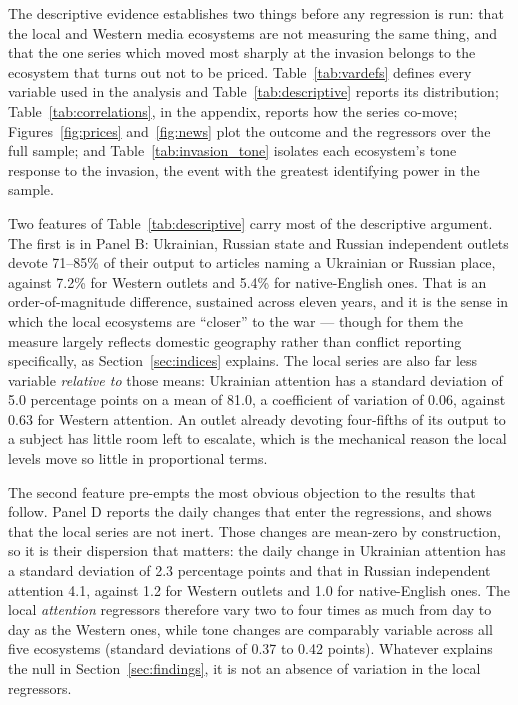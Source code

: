 \documentclass[12pt,a4paper]{article}
\begin{document}
The descriptive evidence establishes two things before any regression is run: that the local and Western media ecosystems are not measuring the same thing, and that the one series which moved most sharply at the invasion belongs to the ecosystem that turns out not to be priced. Table~\ref{tab:vardefs} defines every variable used in the analysis and Table~\ref{tab:descriptive} reports its distribution; Table~\ref{tab:correlations}, in the appendix, reports how the series co-move; Figures~\ref{fig:prices} and~\ref{fig:news} plot the outcome and the regressors over the full sample; and Table~\ref{tab:invasion_tone} isolates each ecosystem's tone response to the invasion, the event with the greatest identifying power in the sample.

Two features of Table~\ref{tab:descriptive} carry most of the descriptive argument. The first is in Panel B: Ukrainian, Russian state and Russian independent outlets devote 71--85\% of their output to articles naming a Ukrainian or Russian place, against 7.2\% for Western outlets and 5.4\% for native-English ones. That is an order-of-magnitude difference, sustained across eleven years, and it is the sense in which the local ecosystems are ``closer'' to the war --- though for them the measure largely reflects domestic geography rather than conflict reporting specifically, as Section~\ref{sec:indices} explains. The local series are also far less variable \textit{relative to} those means: Ukrainian attention has a standard deviation of 5.0 percentage points on a mean of 81.0, a coefficient of variation of 0.06, against 0.63 for Western attention. An outlet already devoting four-fifths of its output to a subject has little room left to escalate, which is the mechanical reason the local levels move so little in proportional terms.

The second feature pre-empts the most obvious objection to the results that follow. Panel D reports the daily changes that enter the regressions, and shows that the local series are not inert. Those changes are mean-zero by construction, so it is their dispersion that matters: the daily change in Ukrainian attention has a standard deviation of 2.3 percentage points and that in Russian independent attention 4.1, against 1.2 for Western outlets and 1.0 for native-English ones. The local \textit{attention} regressors therefore vary two to four times as much from day to day as the Western ones, while tone changes are comparably variable across all five ecosystems (standard deviations of 0.37 to 0.42 points). Whatever explains the null in Section~\ref{sec:findings}, it is not an absence of variation in the local regressors.
\end{document}
